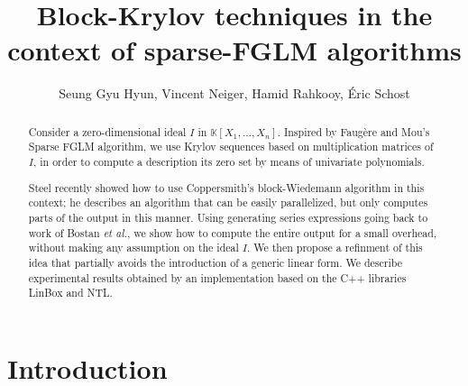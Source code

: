 \documentclass[12pt]{article}
\title{Block-Krylov techniques in the context of sparse-FGLM algorithms}
\author{Seung Gyu Hyun, Vincent Neiger, Hamid Rahkooy, \'Eric Schost}
\def\K{\mathbb{K}}
\def\K {\ensuremath{\mathbb{K}}}
\begin{document}
\maketitle

\begin{abstract}
  Consider a zero-dimensional ideal $I$ in $\K[X_1,\dots,X_n]$.
  Inspired by Faug\`ere and Mou's Sparse FGLM algorithm, we use Krylov
  sequences based on multiplication matrices of $I$, in order to compute a
  description its zero set by means of univariate polynomials.

  Steel recently showed how to use Coppersmith's block-Wiedemann
  algorithm in this context; he describes an algorithm that can be
  easily parallelized, but only computes parts of the output in this
  manner. Using generating series expressions going back to work of
  Bostan {\it et al.}, we show how to compute the entire output for a
  small overhead, without making any assumption on the ideal $I$. We
  then propose a refinment of this idea that partially avoids the
  introduction of a generic linear form.  We describe experimental
  results obtained by an implementation based on the C++ libraries
  LinBox and NTL.
\end{abstract}


\section{Introduction}
\end{document}
